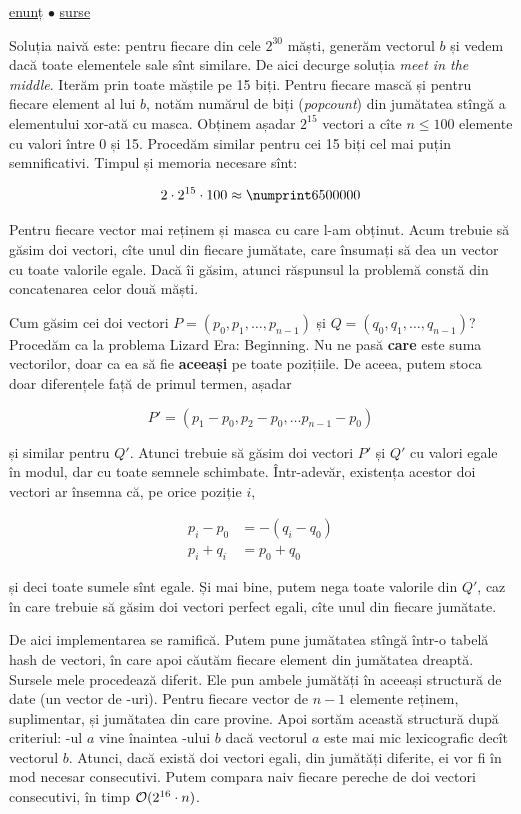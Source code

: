 \documentclass[../main.tex]{subfiles}
\begin{document}
\href{https://codeforces.com/contest/1257/problem/F}{enunț}
$\bullet$
\hyperref[code:make-them-similar]{surse}

Soluția naivă este: pentru fiecare din cele $2^{30}$ măști, generăm vectorul $b$ și vedem dacă toate elementele sale sînt similare. De aici decurge soluția \textit{meet in the middle}. Iterăm prin toate măștile pe 15 biți. Pentru fiecare mască și pentru fiecare element al lui $b$, notăm numărul de biți (\textit{popcount}) din jumătatea stîngă a elementului xor-ată cu masca. Obținem așadar $2^{15}$ vectori a cîte $n \leq 100$ elemente cu valori între 0 și 15. Procedăm similar pentru cei 15 biți cel mai puțin semnificativi. Timpul și memoria necesare sînt:

$$2 \cdot 2^{15} \cdot 100 \approx \np{6500000}$$

Pentru fiecare vector mai reținem și masca cu care l-am obținut. Acum trebuie să găsim doi vectori, cîte unul din fiecare jumătate, care însumați să dea un vector cu toate valorile egale. Dacă îi găsim, atunci răspunsul la problemă constă din concatenarea celor două măști.

Cum găsim cei doi vectori $P = (p_0, p_1, \dots, p_{n-1})$ și $Q = (q_0, q_1, \dots, q_{n-1})$? Procedăm ca la problema Lizard Era: Beginning. Nu ne pasă \textbf{care} este suma vectorilor, doar ca ea să fie \textbf{aceeași} pe toate pozițiile. De aceea, putem stoca doar diferențele față de primul termen, așadar

$$P' = (p_1 - p_0, p_2 - p_0, \dots p_{n-1} - p_0)$$

și similar pentru $Q'$. Atunci trebuie să găsim doi vectori $P'$ și $Q'$ cu valori egale în modul, dar cu toate semnele schimbate. Într-adevăr, existența acestor doi vectori ar însemna că, pe orice poziție $i$,

\begin{align*}
  p_i - p_0 &= -(q_i - q_0)\\
  p_i + q_i &= p_0 + q_0
\end{align*}

și deci toate sumele sînt egale. Și mai bine, putem nega toate valorile din $Q'$, caz în care trebuie să găsim doi vectori perfect egali, cîte unul din fiecare jumătate.

De aici implementarea se ramifică. Putem pune jumătatea stîngă într-o tabelă hash de vectori, în care apoi căutăm fiecare element din jumătatea dreaptă. Sursele mele procedează diferit. Ele pun ambele jumătăți în aceeași structură de date (un vector de -uri). Pentru fiecare vector de $n-1$ elemente reținem, suplimentar, și jumătatea din care provine. Apoi sortăm această structură după criteriul: -ul $a$ vine înaintea -ului $b$ dacă vectorul $a$ este mai mic lexicografic decît vectorul $b$. Atunci, dacă există doi vectori egali, din jumătăți diferite, ei vor fi în mod necesar consecutivi. Putem compara naiv fiecare pereche de doi vectori consecutivi, în timp $\mathcal{O}(2^{16} \cdot n)$.
\end{document}
